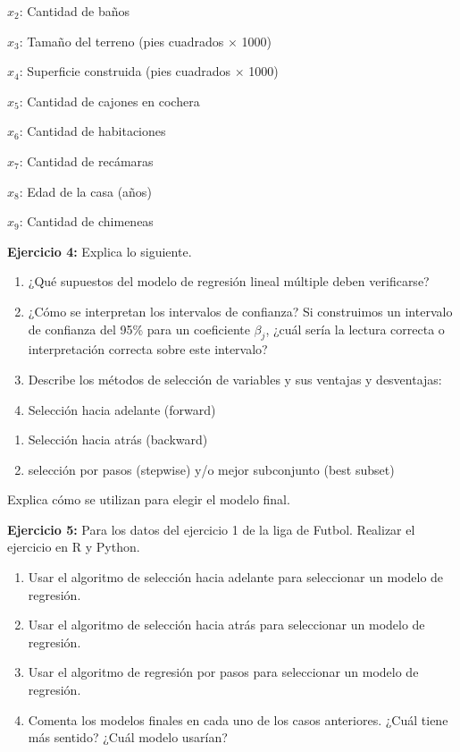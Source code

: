 \documentclass[
]{book}
\begin{document}
\(x_{2}\): Cantidad de baños

\(x_{3}\): Tamaño del terreno (pies cuadrados \(\times\) 1000)

\(x_{4}\): Superficie construida (pies cuadrados \(\times\) 1000)

\(x_{5}\): Cantidad de cajones en cochera

\(x_{6}\): Cantidad de habitaciones

\(x_{7}\): Cantidad de recámaras

\(x_{8}\): Edad de la casa (años)

\(x_{9}\): Cantidad de chimeneas

\textbf{Ejercicio 4:} Explica lo siguiente.

\begin{enumerate}
\def\labelenumi{\alph{enumi})}
\item
  ¿Qué supuestos del modelo de regresión lineal múltiple deben verificarse?
\item
  ¿Cómo se interpretan los intervalos de confianza? Si construimos un intervalo de confianza del 95\% para un coeficiente \(\beta_j\), ¿cuál sería la lectura correcta o interpretación correcta sobre este intervalo?
\item
  Describe los métodos de selección de variables y sus ventajas y desventajas:
\item
  Selección hacia adelante (forward)
\end{enumerate}

\begin{enumerate}
\def\labelenumi{\roman{enumi})}
\setcounter{enumi}{1}
\item
  Selección hacia atrás (backward)
\item
  selección por pasos (stepwise) y/o mejor subconjunto (best subset)
\end{enumerate}

Explica cómo se utilizan para elegir el modelo final.

\textbf{Ejercicio 5:} Para los datos del ejercicio 1 de la liga de Futbol. Realizar el ejercicio en R y Python.

\begin{enumerate}
\def\labelenumi{\alph{enumi})}
\item
  Usar el algoritmo de selección hacia adelante para seleccionar un modelo de regresión.
\item
  Usar el algoritmo de selección hacia atrás para seleccionar un modelo de regresión.
\item
  Usar el algoritmo de regresión por pasos para seleccionar un modelo de regresión.
\item
  Comenta los modelos finales en cada uno de los casos anteriores. ¿Cuál tiene más sentido? ¿Cuál modelo usarían?
\end{enumerate}
\end{document}
